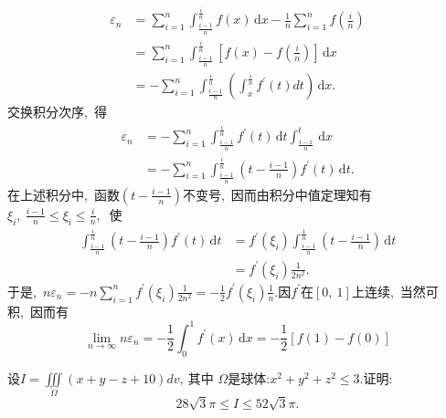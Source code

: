 	\begin{solution}
		\begin{align*}
			\varepsilon_{n} &=\sum_{i=1}^{n} \int_{\frac{i-1}{n}}^{\frac{i}{n}} f(x) \,\text{d} x-\frac{1}{n} \sum_{i=1}^{n} f\left(\frac{i}{n}\right) \\
			&=\sum_{i=1}^{n} \int_{\frac{i-1}{n}}^{\frac{i}{n}}\left[f(x)-f\left(\frac{i}{n}\right)\right] \,\text{d} x \\
			&=-\sum_{i=1}^{n} \int_{\frac{i-1}{n}}^{\frac{i}{n}}\left(\int_{x}^{\frac{i}{n}} f^{\prime}(t) d t\right) \,\text{d} x .
		\end{align*}
		交换积分次序,\ 得
		\begin{align*}
			\varepsilon_{n} &=-\sum_{i=1}^{n} \int_{\frac{i-1}{n}}^{\frac{i}{n}} f^{\prime}(t) \,\text{d} t \int_{\frac{i-1}{n}}^{t} \,\text{d} x \\
			&=-\sum_{i=1}^{n} \int_{\frac{i-1}{n}}^{\frac{i}{n}}\left(t-\frac{i-1}{n}\right) f^{\prime}(t) \,\text{d} t .
		\end{align*}
		在上述积分中,\  函数$  \left(t-\frac{i-1}{n}\right)  $不变号,\  因而由积分中值定理知有  $\xi_{i},\  \frac{i-1}{n} \leqslant \xi_{i} \leqslant \frac{i}{n} ,\ $ 使
		\begin{align*}
			\int_{\frac{i-1}{n}}^{\frac{i}{n}}\left(t-\frac{i-1}{n}\right) f^{\prime}(t) \,\text{d} t &=f^{\prime}\left(\xi_{i}\right) \int_{\frac{i-1}{n}}^{\frac{1}{n}}\left(t-\frac{i-1}{n}\right) \,\text{d} t \\
			&=f^{\prime}\left(\xi_{i}\right) \frac{1}{2 n^{2}} .
		\end{align*}
		于是,\ $n\varepsilon_n=-n\sum\limits_{i=1}^{n}f^{\prime}\left(\xi_{i}\right) \frac{1}{2 n^{2}}=-\frac{1}{2}f^{\prime}\left(\xi_{i}\right) \frac{1}{n}.$因$f^\prime$在$[0,\ 1]$上连续,\ 当然可积,\ 因而有
		$$\lim\limits_{n\rightarrow\infty}n\varepsilon_n=-\frac{1}{2}\int_{0}^{1}f^\prime(x)\,\text{d}x=-\frac{1}{2}\left[f(1)-f(0)\right]$$ 
	\end{solution}
	\newpage
	\begin{problem}
		设$I=\iiint\limits_{\Omega}(x+y-z+10) d v ,\  $其中 $ \Omega  $是球体:$  x^{2}+y^{2}+z^{2} \leqslant 3 . $证明:
		$$28 \sqrt{3} \pi \leqslant I \leqslant 52 \sqrt{3} \pi .$$
	\end{problem}
	
